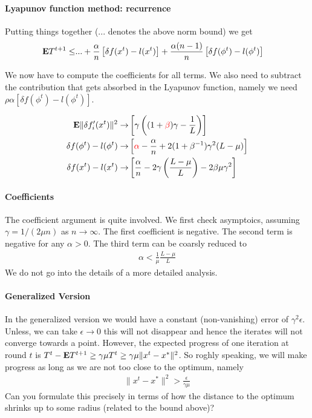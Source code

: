 \documentclass{article}
\newcommand{\E}{{\bf E}}
\newcommand{\highlight}[1]{\textcolor{red}{#1}}
\begin{document}
\paragraph*{Lyapunov function method: recurrence}

Putting things together ($...$ denotes the above norm bound) we get 
\begin{align}
\E T^{t+1} \leq &... + \frac {\alpha} n \left[ \delta f(x^t) - l(x^t) \right] +  \frac{\alpha(n-1)}{n} \left[ \delta f(\phi^t) -  l(\phi^t) \right] 
\end{align}

We now have to compute the coefficients for all terms. We also need to subtract the contribution that gets absorbed in the Lyapunov function, namely we need $\rho \alpha \left[ \delta f(\phi^t) - l(\phi^t) \right]$.

\begin{align}
\E \| \delta f'_i(x^t) \|^2 \to & \left[ \gamma \left((1+\highlight{\beta}) \gamma - \frac 1L \right)  \right]  \\
\delta f(\phi^t) - l(\phi^t) \to & \left[ \highlight{\alpha} - \frac{\alpha}{n} + 2(1+\beta^{-1}) \gamma^2 (L - \mu) \right] 
\\
\delta f(x^t)  - l(x^t) 
\to & \left[ \frac \alpha n- 2\gamma \left( \frac{L -\mu}{L} \right)- 2 \beta \mu \gamma^2  \right] 
\end{align}

\paragraph*{Coefficients}

The coefficient argument is quite involved. We first check asymptoics, assuming $\gamma = 1/(2\mu n)$ as $n \to \infty$.  The first coefficient is negative. The second term is negative for any $\alpha>0$. The third term can be coarsly reduced to 
\begin{align}
\alpha < \frac{1}{\mu}\frac{L-\mu}{L} 
\end{align}
We do not go into the details of a more detailed analysis. 

\paragraph*{Generalized Version}

In the generalized version we would have a constant (non-vanishing) error of $\gamma^2 \epsilon$. Unless, we can take $\epsilon \to 0$ this will not disappear and hence the iterates will not converge towards a point. However, the expected progress of one iteration at round $t$ is $T^t - \E T^{t+1} \geq \gamma \mu T^t \geq \gamma \mu \| x^t - x^*\|^2$. So roghly speaking, we will make progress as long as  we are not too close to the optimum, namely
\begin{align}
\| x^t - x^*\|^2 > \frac{\epsilon}{\gamma  \mu}
\end{align} 
Can you formulate this precisely in terms of how the distance to the optimum shrinks up to some radius (related to the bound above)? 
\end{document}
